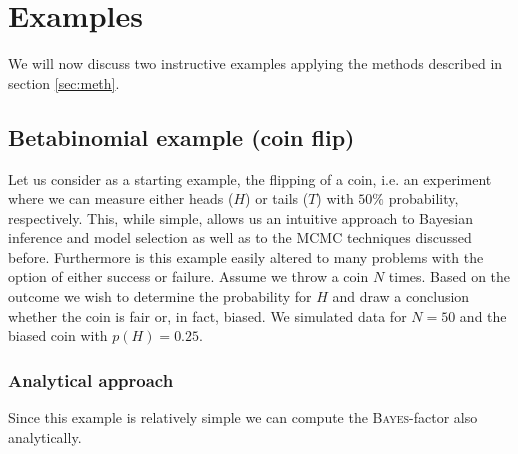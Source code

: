 \documentclass[%
 reprint,
 amsmath,amssymb,
 aps,
]{revtex4-1}
\begin{document}
\section{Examples}
We will now discuss two instructive examples applying the methods described in section \eqref{sec:meth}.

\subsection{Betabinomial example (coin flip)}
Let us consider as a starting example, the flipping of a coin, i.e. an experiment where we can measure either heads ($H$) or tails ($T$) with $50\%$ probability, respectively. This, while simple, allows us an intuitive approach to Bayesian inference and model selection as well as to the MCMC techniques discussed before. Furthermore is this example easily altered to many problems with the option of either success or failure. Assume we throw a coin $N$ times.  Based on the outcome we wish to determine the probability for $H$ and draw a conclusion whether the coin is fair or, in fact, biased. We simulated data for $N=50$ and the biased coin with $p(H)=0.25$.
\subsubsection{\textbf{Analytical approach}}
Since this example is relatively simple we can compute the \textsc{Bayes}-factor also analytically.
\end{document}
